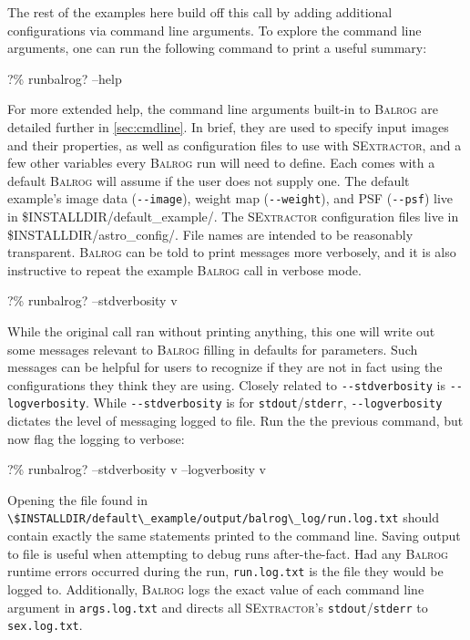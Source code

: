 \documentclass[11pt]{book}
\newcommand{\codett}[1]{\lstinline{#1}}
\newcommand{\balrog}{\textsc{Balrog}}
\newcommand{\sex}{\textsc{SExtractor}}
\newcommand{\opt}[1]{\codett{--#1}}
\newcommand{\bcmd}{\% runbalrog}
\begin{document}
\noindent The rest of the examples here build off this call by adding additional configurations via command line arguments.
To explore the command line arguments, one can run the following command to print a useful summary:

\begin{cmdline}
?\bcmd{}? --help
\end{cmdline}

\noindent For more extended help, the command line arguments built-in to \balrog{} are detailed further in \autoref{sec:cmdline}.
In brief, they are used to specify input images and their properties, as well as configuration
files to use with \sex{}, and a few other variables every \balrog{} run will need to define. 
Each comes with a default \balrog{} will assume if the user does not supply one.
The default example's image data (\opt{image}), 
weight map (\opt{weight}), 
and PSF (\opt{psf})
live in {\ttfamily \$INSTALLDIR/default\_example/}.
The \sex{} configuration files live in 
{\ttfamily \$INSTALLDIR/astro\_config/}. 
File names are intended to be reasonably transparent.
\balrog{} can be told to print messages more verbosely, 
and it is also instructive to repeat the example \balrog{} call in verbose mode.

\begin{cmdline}
?\bcmd{}? --stdverbosity v
\end{cmdline}

\noindent While the original call ran without printing anything, this one will write out some messages
relevant to \balrog{} filling in defaults for parameters.
Such messages can be helpful for users to recognize 
if they are not in fact using the configurations they think they are using.
Closely related to \opt{stdverbosity} is \opt{logverbosity}.
While \opt{stdverbosity} is for \codett{stdout}/\codett{stderr},
\opt{logverbosity} dictates the level of messaging logged to file.
Run the the previous command, but now flag the logging to verbose:

\begin{cmdline}
?\bcmd? --stdverbosity v --logverbosity v
\end{cmdline}

\noindent Opening the file found in \codett{\$INSTALLDIR/default\_example/output/balrog\_log/run.log.txt}
should contain exactly the same statements printed to the command line.
Saving output to file is useful when attempting to debug runs after-the-fact.
Had any \balrog{} runtime errors occurred during the run,
\codett{run.log.txt} is the file they would be logged to.
Additionally, \balrog{} logs the exact value of each command line argument  in \codett{args.log.txt}
and directs all \sex{}'s \codett{stdout}/\codett{stderr} to \codett{sex.log.txt}.
\end{document}
